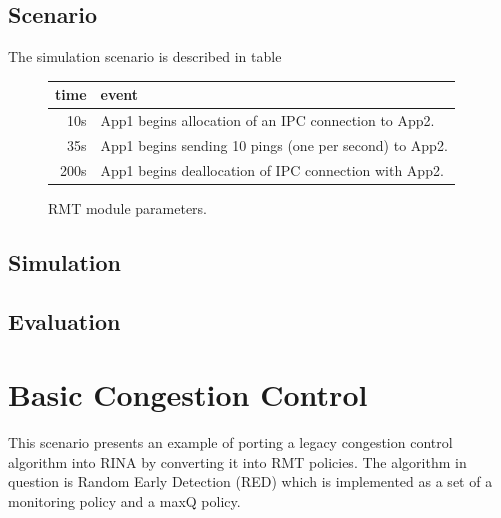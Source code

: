         \subsection{Scenario}

            The simulation scenario is described in table

            \begin{figure}[H]
                \begin{center}
                  \begin{tabular}{ r | l }
                    time & event \\
                    \hline
                    10s & App1 begins allocation of an IPC connection to App2. \\
                    35s & App1 begins sending 10 pings (one per second) to App2. \\
                    200s & App1 begins deallocation of IPC connection with App2. \\
                    \hline
                  \end{tabular}
                  \caption{RMT module parameters.}
                  \label{fig:rmt_params}
                \end{center}
            \end{figure}

        \subsection{Simulation}

        \subsection{Evaluation}

    \section{Basic Congestion Control}

        This scenario presents an example of porting a legacy congestion control algorithm into RINA by converting it into RMT policies. The algorithm in question is Random Early Detection (RED) which is implemented as a set of a monitoring policy and a maxQ policy.

